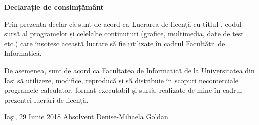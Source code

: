 \hfill \break
\hfill \break

\begin{center}
	\textbf{\large{Declarație de consimțământ}}
\end{center}

\hfill \break
\hfill \break

Prin prezenta declar că sunt de acord ca Lucrarea de licență cu titlul , codul sursă al programelor și celelalte conținuturi  (grafice, multimedia, date de test etc.) care însoțesc această lucrare să fie utilizate în cadrul Facultății de Informatică. 

De asemenea, sunt de acord ca Facultatea de Informatică de la Universitatea  din Iași să utilizeze, modifice, reproducă și să distribuie în scopuri necomerciale programele-calculator, format executabil și sursă, realizate de mine în cadrul prezentei lucrări de licență. 

\hfill \break
\hfill \break
\hfill \break
\hfill \break

Iaşi, 29 Iunie 2018 \hfill Absolvent Denise-Mihaela Goldan\\

\clearpage